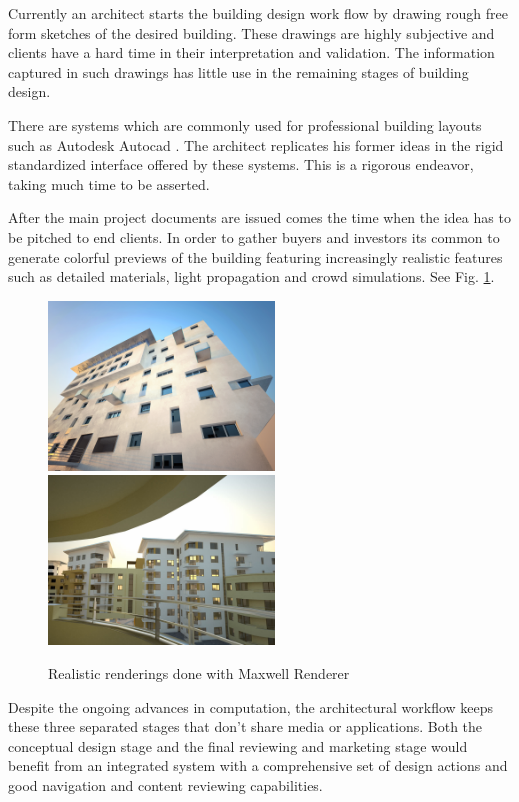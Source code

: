 Currently an architect starts the building design work flow by drawing rough
free form sketches of the desired building. These drawings are highly subjective
and clients have a hard time in their interpretation and validation.
The information captured in such drawings has little use in the remaining stages
of building design.


There are systems which are commonly used for professional building layouts
such as Autodesk Autocad \cite{SITE-AUTOCAD}.
The architect replicates his former ideas in the rigid standardized interface
offered by these systems. This is a rigorous endeavor, taking much time to be asserted.

After the main project documents are issued comes the time when the idea has to be pitched to end clients.
In order to gather buyers and investors its common to generate colorful previews of the building featuring increasingly realistic features such as detailed materials, light propagation and crowd simulations.
See Fig. \ref{FIG-REALISTIC}.

\begin{figure}[!ht]
	\centering
	\includegraphics[width=6cm]{gfx/realistic01.jpg}
	\includegraphics[width=6cm]{gfx/realistic03.jpg}
	\caption{Realistic renderings done with Maxwell Renderer}
	\label{FIG-REALISTIC}
\end{figure}

Despite the ongoing advances in computation, the architectural workflow keeps these three separated stages
that don't share media or applications.%
Both the conceptual design stage and the final reviewing and marketing stage would benefit from 
an integrated system with a comprehensive set of design actions
and good navigation and content reviewing capabilities.

